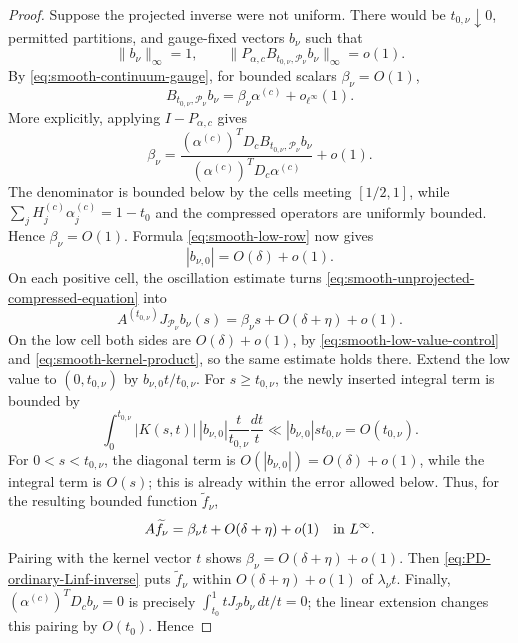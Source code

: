 \documentclass[11pt]{article}
\numberwithin{equation}{section}
\theoremstyle{definition}
\theoremstyle{remark}
\newcommand{\1}{\mathbf 1}
\begin{document}
\begin{proof}
Suppose the projected inverse were not uniform.  There would be
\(t_{0,\nu}\downarrow0\), permitted partitions, and gauge-fixed vectors
\(b_\nu\) such that
\[
 \|b_\nu\|_\infty=1,\qquad
 \|P_{\alpha,c}B_{t_{0,\nu},\mathcal P_\nu}b_\nu\|_\infty=o(1).
\]
By \eqref{eq:smooth-continuum-gauge}, for bounded scalars
\(\beta_\nu=O(1)\),
\begin{equation}
 B_{t_{0,\nu},\mathcal P_\nu}b_\nu
 =\beta_\nu\alpha^{(c)}+o_{\ell^\infty}(1).
 \label{eq:smooth-unprojected-compressed-equation}
\end{equation}
More explicitly, applying \(I-P_{\alpha,c}\) gives
\[
 \beta_\nu=
 \frac{(\alpha^{(c)})^TD_c
       B_{t_{0,\nu},\mathcal P_\nu}b_\nu}
      {(\alpha^{(c)})^TD_c\alpha^{(c)}}+o(1).
\]
The denominator is bounded below by the cells meeting \([1/2,1]\), while
\(\sum_jH_j^{(c)}\alpha_j^{(c)}=1-t_0\) and the compressed operators are
uniformly bounded.  Hence \(\beta_\nu=O(1)\).  Formula
\eqref{eq:smooth-low-row}
now gives
\begin{equation}
 |b_{\nu,0}|=O(\delta)+o(1).
 \label{eq:smooth-low-value-control}
\end{equation}
On each positive cell, the oscillation estimate turns
\eqref{eq:smooth-unprojected-compressed-equation} into
\[
 A^{(t_{0,\nu})}J_{\mathcal P_\nu}b_\nu(s)
 =\beta_\nu s+O(\delta+\eta)+o(1).
\]
On the low cell both sides are \(O(\delta)+o(1)\), by
\eqref{eq:smooth-low-value-control} and
\eqref{eq:smooth-kernel-product}, so the same estimate holds there.
Extend the low value to \((0,t_{0,\nu})\) by
\(b_{\nu,0}t/t_{0,\nu}\).  For \(s\geq t_{0,\nu}\), the newly inserted
integral term is bounded by
\[
 \int_0^{t_{0,\nu}}|K(s,t)|\,|b_{\nu,0}|
       \frac{t}{t_{0,\nu}}\frac{dt}{t}
 \ll |b_{\nu,0}|s t_{0,\nu}=O(t_{0,\nu}).
\]
For \(0<s<t_{0,\nu}\), the diagonal term is
\(O(|b_{\nu,0}|)=O(\delta)+o(1)\), while the integral term is
\(O(s)\); this is already within the error allowed below.  Thus, for
the resulting bounded function \(\widetilde f_\nu\),
\begin{equation}
 A\widetilde f_\nu=\beta_\nu t+O(\delta+\eta)+o(1)
 \quad\hbox{in }L^\infty.
 \label{eq:smooth-full-reconstructed-equation}
\end{equation}
Pairing with the kernel vector \(t\) shows
\(\beta_\nu=O(\delta+\eta)+o(1)\).  Then
\eqref{eq:PD-ordinary-Linf-inverse} puts \(\widetilde f_\nu\) within
\(O(\delta+\eta)+o(1)\) of \(\lambda_\nu t\).  Finally,
\((\alpha^{(c)})^TD_cb_\nu=0\) is precisely
\(\int_{t_0}^1tJ_{\mathcal P}b_\nu\,dt/t=0\); the linear extension
changes this pairing by \(O(t_0)\).  Hence

\end{proof}
\end{document}
